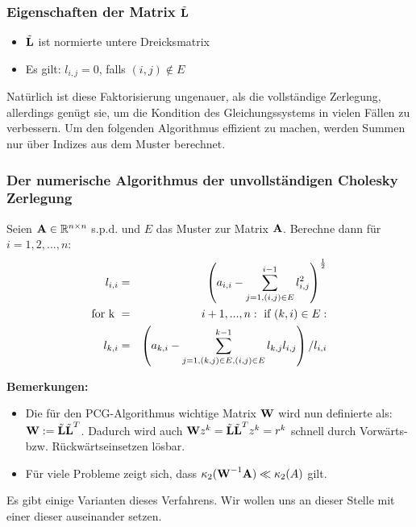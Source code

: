 \subsubsection{Eigenschaften der Matrix $\tilde{{\textbf{L}}}$}\label{sss.Eigenschaften L CZ}
\begin{itemize}
\item $\tilde{{\textbf{L}}}$ ist normierte untere Dreicksmatrix
\item Es gilt: $l_{i,j} = 0$, falls $(i,j) \notin E$
\end{itemize}

Natürlich ist diese Faktorisierung ungenauer, als die vollständige Zerlegung, allerdings genügt sie, um die Kondition des Gleichungssystems in vielen Fällen zu verbessern. Um den folgenden Algorithmus effizient zu machen, werden Summen nur über Indizes aus dem Muster berechnet.

\subsubsection{Der numerische Algorithmus der unvollständigen Cholesky Zerlegung}\label{sss.Cholesky-Algorithmus}

Seien ${\textbf{A}} \in \mathbb{R}^{n \times n}$ s.p.d. und $E$ das Muster zur Matrix ${\textbf{A}}$. Berechne dann für $i=1,2,...,n$:
\begin{eqnarray}
l_{i,i} &=& \left( a_{i,i} - \sum^{i-1}_{j=1,(i,j) \in E} l_{i,j}^{2} \right)^{\frac {1} {2}} \\
\textnormal{for k } &=& i+1,...,n: \textnormal{ if } (k,i) \in E: \\
l_{k,i} &=& \left( a_{k,i} - \sum^{k-1}_{j=1,(k,j) \in E, (i,j) \in E} l_{k,j} l_{i,j} \right) / l_{i,i}
\end{eqnarray}

\textbf{Bemerkungen:}

\begin{itemize}
\item Die für den PCG-Algorithmus wichtige Matrix ${\textbf{W}}$ wird nun definierte als: ${\textbf{W}} := \tilde{{\textbf{L}}} \tilde{{\textbf{L}}}^{T}$. Dadurch wird auch ${\textbf{W}}z^{k} = \tilde{{\textbf{L}}} \tilde{{\textbf{L}}}^{T}z^{k} = r^{k}$ schnell durch Vorwärts- bzw. Rückwärtseinsetzen lösbar.
\item Für viele Probleme zeigt sich, dass $\kappa_{2}({\textbf{W}}^{-1} {\textbf{A}}) \ll \kappa_{2} (A)$ gilt. \\
\end{itemize}

Es gibt einige Varianten dieses Verfahrens. Wir wollen uns an dieser Stelle mit einer dieser auseinander setzen.

